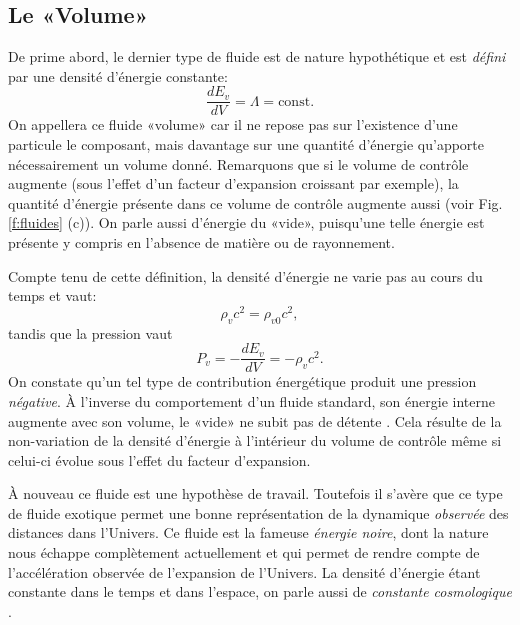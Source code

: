 \subsection{Le «Volume»}
De prime abord, le dernier type de fluide est de nature hypothétique et est \textit{défini} par une densité d'énergie constante:
\begin{equation}
\frac{dE_v}{dV}=\Lambda=\mathrm{const.}
\end{equation}
On appellera ce fluide «volume» car il ne repose pas sur l'existence d'une particule le composant, mais davantage sur une quantité d'énergie qu'apporte nécessairement un volume donné. Remarquons que si le volume de contrôle augmente (sous l'effet d'un facteur d'expansion croissant par exemple), la quantité d'énergie présente dans ce volume de contrôle augmente aussi (voir Fig. \ref{f:fluides} (c)).  On parle aussi d'énergie du «vide», puisqu'une telle énergie est présente y compris en l'absence de matière ou de rayonnement.

Compte tenu de cette définition, la densité d'énergie ne varie pas au cours du temps et vaut:
\begin{equation}
\rho_vc^2=\rho_{v0}c^2,
\end{equation}
tandis que la pression vaut
\begin{equation}
P_v=-\frac{dE_v}{dV}=-\rho_vc^2.
\end{equation}
On constate qu'un tel type de contribution énergétique produit une pression \textit{négative}. À l'inverse du comportement d'un fluide standard, son énergie interne augmente avec son volume, le «vide» ne subit pas de détente . Cela résulte de la non-variation de la densité d'énergie à l'intérieur du volume de contrôle même si celui-ci évolue sous l'effet du facteur d'expansion.

À nouveau ce fluide est une hypothèse de travail. Toutefois il s'avère que ce type de fluide exotique permet une bonne représentation de la dynamique \textit{observée} des distances dans l'Univers. Ce fluide est la fameuse \textit{énergie noire}, dont la nature nous échappe complètement actuellement et qui permet de rendre compte de l'accélération observée de l'expansion de l'Univers. La densité d'énergie étant constante dans le temps et dans l'espace, on parle aussi de \textit{constante cosmologique} .


